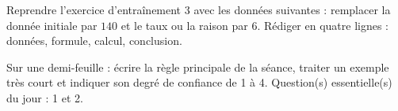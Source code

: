 
    \begin{dm}Reprendre l'exercice d'entraînement 3 avec les données suivantes : remplacer la donnée initiale par $140$ et le taux ou la raison par $6$. Rédiger en quatre lignes : données, formule, calcul, conclusion.\end{dm}

    \begin{sortie}Sur une demi-feuille : écrire la règle principale de la séance, traiter un exemple très court et indiquer son degré de confiance de 1 à 4. Question(s) essentielle(s) du jour : 1 et 2.\end{sortie}

